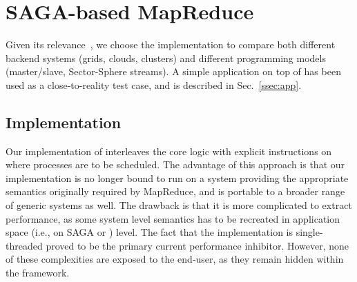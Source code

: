 \documentclass[3p,twocolumn]{elsarticle}
\begin{document}
\section{SAGA-based MapReduce}
\label{sec:mr}

 Given its relevance~\cite{saga_ccgrid09}, we choose the \smr
 implementation to compare both different backend systems (grids,
 clouds, clusters) and different programming models (master/slave,
 Sector-Sphere streams).  A simple \wc application on top of
 \smr has been used as a close-to-reality test case, and is
 described in Sec.~\ref{ssec:app}.


\subsection{\sagamapreduce Implementation}


Our implementation of \sagamapreduce interleaves the core \mr logic
with explicit instructions on where processes are to be scheduled.
The advantage of this approach is that our implementation is no longer
bound to run on a system providing the appropriate semantics
originally required by MapReduce, and is portable to a broader range
of generic systems as well.  The drawback is that it is more
complicated to extract performance, as some system level semantics has
to be recreated in application space (i.e., on SAGA or \smr) level.
The fact that the implementation is single-threaded proved to be the
primary current performance inhibitor.  However, none of these
complexities are exposed to the end-user, as they remain hidden within
the framework. 

\end{document}

